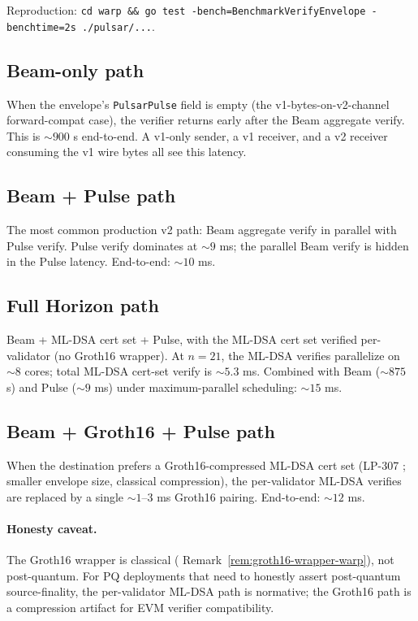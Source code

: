 Reproduction: \texttt{cd warp \&\& go test -bench=BenchmarkVerifyEnvelope -benchtime=2s ./pulsar/...}.

\subsection{Beam-only path}

When the envelope's \texttt{PulsarPulse} field is empty (the v1-bytes-on-v2-channel forward-compat case), the verifier returns early after the Beam aggregate verify. This is $\sim 900$ \textmu s end-to-end. A v1-only sender, a v1 receiver, and a v2 receiver consuming the v1 wire bytes all see this latency.

\subsection{Beam + Pulse path}

The most common production v2 path: Beam aggregate verify in parallel with Pulse verify. Pulse verify dominates at $\sim 9$ ms; the parallel Beam verify is hidden in the Pulse latency. End-to-end: $\sim 10$ ms.

\subsection{Full Horizon path}

Beam + ML-DSA cert set + Pulse, with the ML-DSA cert set verified per-validator (no Groth16 wrapper). At $n = 21$, the ML-DSA verifies parallelize on $\sim 8$ cores; total ML-DSA cert-set verify is $\sim 5.3$ ms. Combined with Beam ($\sim 875$ \textmu s) and Pulse ($\sim 9$ ms) under maximum-parallel scheduling: $\sim 15$ ms.

\subsection{Beam + Groth16 + Pulse path}

When the destination prefers a Groth16-compressed ML-DSA cert set (LP-307 \cite{lp307}; smaller envelope size, classical compression), the per-validator ML-DSA verifies are replaced by a single $\sim 1$--$3$ ms Groth16 pairing. End-to-end: $\sim 12$ ms.

\paragraph{Honesty caveat.} The Groth16 wrapper is classical (\cite{luxwarpv2} Remark~\ref{rem:groth16-wrapper-warp}), not post-quantum. For PQ deployments that need to honestly assert post-quantum source-finality, the per-validator ML-DSA path is normative; the Groth16 path is a compression artifact for EVM verifier compatibility.

